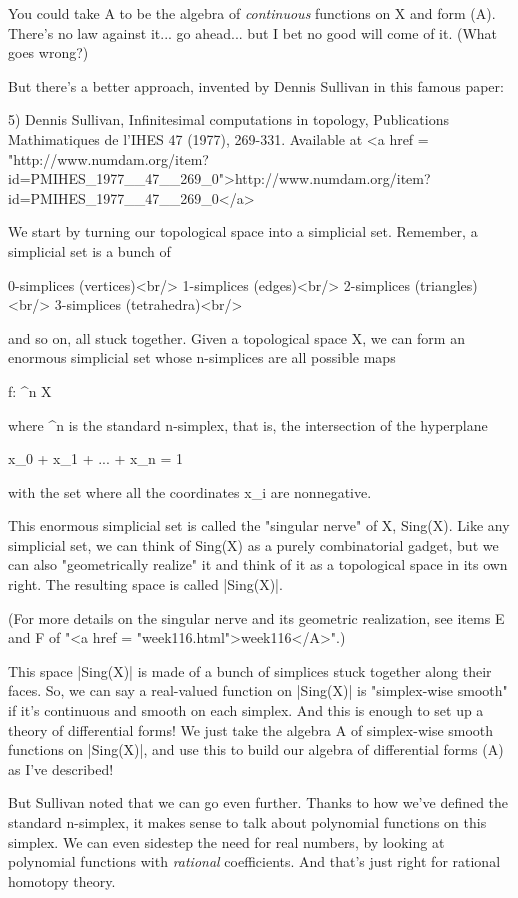 You could take A to be the algebra of \emph{continuous} functions on X and
form \Omega (A).  There's no law against it... go ahead... but I bet
no good will come of it.  (What goes wrong?)

But there's a better approach, invented by Dennis Sullivan in this
famous paper:

5) Dennis Sullivan, Infinitesimal computations in topology,
Publications Mathimatiques de l'IHES 47 (1977), 269-331.  Available
at <a href = "http://www.numdam.org/item?id=PMIHES_1977__47__269_0">http://www.numdam.org/item?id=PMIHES_1977__47__269_0</a>

We start by turning our topological space into a simplicial set.  
Remember, a simplicial set is a bunch of

0-simplices (vertices)<br/>
1-simplices (edges)<br/>
2-simplices (triangles)<br/>
3-simplices (tetrahedra)<br/>

and so on, all stuck together.  Given a topological space X, we can 
form an enormous simplicial set whose n-simplices are all possible
maps 

f: \Delta ^{n} \to  X

where \Delta ^{n} is the standard n-simplex, that is, the intersection
of the hyperplane 

x_{0} + x_{1} + ... + x_{n} = 1

with the set where all the coordinates x_{i} are nonnegative.

This enormous simplicial set is called the "singular nerve"
of X, Sing(X).  Like any simplicial set, we can think of Sing(X) as a
purely combinatorial gadget, but we can also "geometrically
realize" it and think of it as a topological space in its own
right.  The resulting space is called |Sing(X)|.

(For more details on the singular nerve and its geometric realization,
see items E and F of "<a href = "week116.html">week116</A>".)

This space |Sing(X)| is made of a bunch of simplices stuck together
along their faces.  So, we can say a real-valued function on |Sing(X)|
is "simplex-wise smooth" if it's continuous and smooth on each
simplex.  And this is enough to set up a theory of differential forms!
We just take the algebra A of simplex-wise smooth functions on
|Sing(X)|, and use this to build our algebra of differential forms
\Omega (A) as I've described!

But Sullivan noted that we can go even further.  Thanks to how we've
defined the standard n-simplex, it makes sense to talk about
polynomial functions on this simplex.  We can even sidestep the need
for real numbers, by looking at polynomial functions with \emph{rational}
coefficients.  And that's just right for rational homotopy theory.

